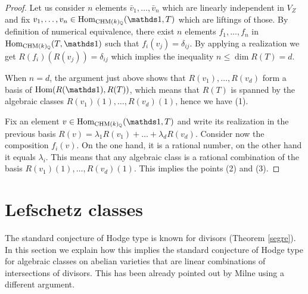 \documentclass[11pt]{amsart}
\begin{document}
\begin{proof}
Let us consider $n$ elements $\bar{v}_1,\ldots,\bar{v}_n$ which are linearly independent in $V_Z$ and fix $v_1,\ldots,v_n\in \Hom_{\CHM(k)_\Q}(\one,T)$ which are liftings of those. By definition of numerical equivalence, there exist  $n$ elements   $f_1,\ldots,f_n $  in $\Hom_{\CHM(k)_\Q}( T,\one)$ such that $f_i(v_j)=\delta_{ij}$. By applying a realization we get $R(f_i)(R(v_j))=\delta_{ij}$ which implies the inequality ${n \leq \dim R(T)=d.}$


When $n=d$, the argument just above shows that $R(v_1),\ldots,R(v_d)$ form a basis of $\Hom(R(\one),R(T))$, which means that $R(T)$ is spanned by the  algebraic classes $R(v_1)(1),\ldots,R(v_d)(1)$, hence we have (1).

Fix  an element $v\in \Hom_{\CHM(k)_\Q}(\one,T)$ and write its realization in the previous basis $R(v)= \lambda_1 R(v_1)+ \ldots + \lambda_d R(v_d)$. Consider now the composition $f_i(v)$. On the one hand, it is a rational number, on the other hand it equals $\lambda_i$. This means that any algebraic class is a rational combination of the basis $R(v_1)(1),\ldots,R(v_d)(1)$. This implies the points (2) and (3).
\end{proof}

\section{Lefschetz classes}\label{sectionlefschetz}
The standard conjecture of Hodge type is known for divisors (Theorem \ref{segre}). In this section we explain how this implies the standard conjecture of Hodge type   for algebraic classes on abelian varieties that are linear combinations of intersections of divisors. This has been already pointed out by Milne \cite[Remark 3.7]{pola} using a different argument.
\end{document}
